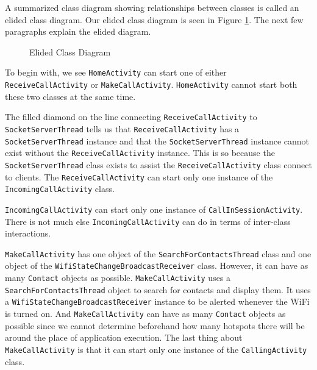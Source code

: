 \documentclass[12pt,svgnames,smaller]{article} %
\begin{document}
	A summarized class diagram showing relationships between classes is called an elided class diagram. Our elided class diagram is seen in Figure \ref{fig:SystemAnalysisandDesign-Class_Diagram_-_Elided}. The next few paragraphs explain the elided diagram.
	
	\begin{figure}
		\centering
		\caption{Elided Class Diagram}%
		\label{fig:SystemAnalysisandDesign-Class_Diagram_-_Elided}
	\end{figure}
	
	To begin with, we see \texttt{HomeActivity} can start one of either \texttt{ReceiveCallActivity} or \texttt{MakeCallActivity}. \texttt{HomeActivity} cannot start both these two classes at the same time.
	
	The filled diamond on the line connecting \texttt{ReceiveCallActivity} to \texttt{SocketServerThread} tells us that \texttt{ReceiveCallActivity} has a \texttt{SocketServerThread} instance and that the \texttt{SocketServerThread} instance cannot exist without the \texttt{ReceiveCallActivity} instance. This is so because the \texttt{SocketServerThread} class exists to assist the \texttt{ReceiveCallActivity} class connect to clients. The \texttt{ReceiveCallActivity} can start only one instance of the \texttt{IncomingCallActivity} class.
	
	\texttt{IncomingCallActivity} can start only one instance of \texttt{CallInSessionActivity}. There is not much else \texttt{IncomingCallActivity} can do in terms of inter-class interactions.
	
	\texttt{MakeCallActivity} has one object of the \texttt{SearchForContactsThread} class and one object of the \texttt{WifiStateChangeBroadcastReceiver} class. However, it can have as many \texttt{Contact} objects as possible. \texttt{MakeCallActivity} uses a \texttt{SearchForContactsThread} object to search for contacts and display them. It uses a \texttt{WifiStateChangeBroadcastReceiver} instance to be alerted whenever the WiFi is turned on. And \texttt{MakeCallActivity} can have as many \texttt{Contact} objects as possible since  we cannot determine beforehand how many hotspots there will be around the place of application execution. The last thing about \texttt{MakeCallActivity} is that it can start only one instance of the \texttt{CallingActivity} class. 
	
\end{document}
